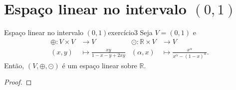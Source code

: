 \section[Espaço linear no intervalo (0,1)]{Espaço linear no intervalo \((0,1)\)}
\begin{proposition}{Espaço linear no intervalo \((0,1)\)}{exercício3}
    Seja \(V = (0,1)\) e
    \begin{align*}
        \oplus : V \times V &\to V&
        \odot : \mathbb{R} \times V &\to V\\
        (x,y) &\mapsto \frac{xy}{1 - x - y + 2xy}&
        (\alpha,x) &\mapsto \frac{x^\alpha}{x^\alpha - (1-x)^\alpha}.
    \end{align*}
    Então, \((V, \oplus, \odot)\) é um espaço linear sobre \(\mathbb{R}\).
\end{proposition}
\begin{proof}

\end{proof}
